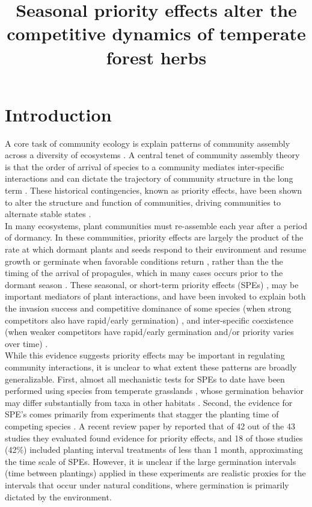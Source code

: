 \documentclass[11pt]{article}\usepackage[]{graphicx}\usepackage[]{color}
\title{Seasonal priority effects alter the competitive dynamics of temperate forest herbs }
\begin{document}
\maketitle


\section*{Introduction}
\noindent A core task of community ecology is explain patterns of community assembly across a diversity of ecosystems \citep{Weiher:2011aa}. A central tenet of community assembly theory is that the order of arrival of species to a community mediates inter-specific interactions and can dictate the trajectory of community structure in the long term \citep{Fukami2015}. These historical contingencies, known as priority effects, have been shown to alter the structure and function of communities, driving communities to alternate stable states \citep{Fukami2011}.\\

\noindent In many ecosystems, plant communities must re-assemble each year after a period of dormancy. In these communities, priority effects are largely the product of the rate at which dormant plants and seeds respond to their environment and resume growth or germinate when favorable conditions return \citep{Rudolf:2019aa}, rather than the the timing of the arrival of propagules, which in many cases occurs prior to the dormant season \citep{Howe:1982aa,Baskin:1988aa}.  These seasonal, or short-term priority effects (SPEs) \citep{Wainwright_2011,Young:2017aa}, may be important mediators of plant interactions, and have been invoked to explain both the invasion success and competitive dominance of some species (when strong competitors also have rapid/early germination) \citep{Gioria2018}, and inter-specific coexistence (when weaker competitors have rapid/early germination and/or priority varies over time) \citep{Towers:2020aa}.\\

\noident While this evidence suggests priority effects may be important in regulating community interactions, it is unclear to what extent these patterns are broadly generalizable. First, almost all mechanistic tests for SPEs to date have been performed using species from temperate grasslands \citep{Weidlich:2020aa}, whose germination behavior may differ substantially from taxa in other habitats \citep{Tudela-Isanta:2018aa}. Second, the evidence for SPE's comes primarily from experiments that stagger the planting time of competing species \citep{Young:2017aa,Letten:2018aa}. A recent review paper by \citet{Weidlich:2020aa} reported that of 42 out of the 43 studies they evaluated found evidence for priority effects, and 18 of those studies (42\%) included planting interval treatments of less than 1 month, approximating the time scale of SPEs. However, it is unclear if the large germination intervals (time between plantings) applied in these experiments are realistic proxies for the intervals that occur under natural conditions, where germination is primarily dictated by the environment.\\
\end{document}
